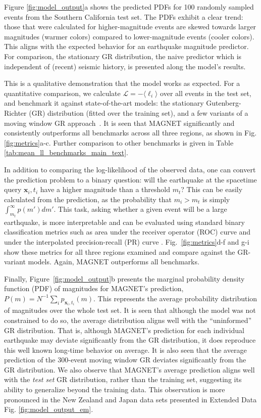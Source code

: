 \documentclass[pdflatex]{sn-jnl}
\begin{document}
Figure \ref{fig:model_output}a shows the predicted PDFs for 100 randomly sampled events from the Southern California test set. The PDFs exhibit a clear trend: those that were calculated for higher-magnitude events are skewed towards larger magnitudes (warmer colors) compared to lower-magnitude events (cooler colors). This aligns with the expected behavior for an earthquake magnitude predictor. For comparison, the stationary GR distribution, the naive predictor which is independent of (recent) seismic history, is presented along the model's results.

This is a qualitative demonstration that the model works as expected. For a quantitative comparison, we calculate $\mathcal{L}=-\langle \ell_i \rangle$ over all events in the test set, and benchmark it against state-of-the-art models:
the stationary Gutenberg-Richter (GR) distribution (fitted over the training set), and a few variants of a moving window GR approach~\cite{gulia_real-time_2019}. It is seen that MAGNET significantly and consistently outperforms all benchmarks across all three regions, as shown in Fig. \ref{fig:metrics}a-c. Further comparison to other benchmarks is given in Table \ref{tab:mean_ll_benchmarks_main_text}.

In addition to comparing the log-likelihood of the observed data, one can convert the prediction problem to a binary question: will the earthquake at the spacetime query $\textbf{x}_i, t_i$ have a higher magnitude than a threshold $m_t$? This can be easily calculated from the prediction, as the probability that $m_i>m_t$ is simply $\int_{m_t}^{\infty}p(m')dm'$.
This task, asking whether a given event will be a large earthquake, is more interpretable and can be evaluated using standard binary classification metrics such as area under the receiver operator (ROC) curve \cite{Murphy} and under the interpolated precision-recall (PR) curve \cite{buttcher_information_2010}. Fig.~\ref{fig:metrics}d-f and g-i show these metrics for all three regions examined and compare against the GR-variant models. Again, MAGNET outperforms all benchmarks.

Finally, Figure~\ref{fig:model_output}b presents the marginal probability density function (PDF) of magnitudes for MAGNET's prediction, $P(m)=N^{-1}\sum_i p_{\textbf{x}_i, t_i}(m)$. This represents the average probability distribution of magnitudes over the whole test set. It is seen that although the model was not constrained to do so, the average distribution aligns well with the ``uninformed'' GR distribution. That is, although MAGNET's prediction for each individual earthquake may deviate significantly from the GR distribution, it does reproduce this well known long-time behavior on average. It is also seen that the average prediction of the 300-event moving window GR deviates significantly from the GR distribution. We also observe that MAGNET's average prediction aligns well with the \emph{test set} GR distribution, rather than the training set, suggesting its ability to generalize beyond the training data. This observation is more pronounced in the New Zealand and Japan data sets presented in Extended Data Fig. \ref{fig:model_output_em}.
\end{document}
